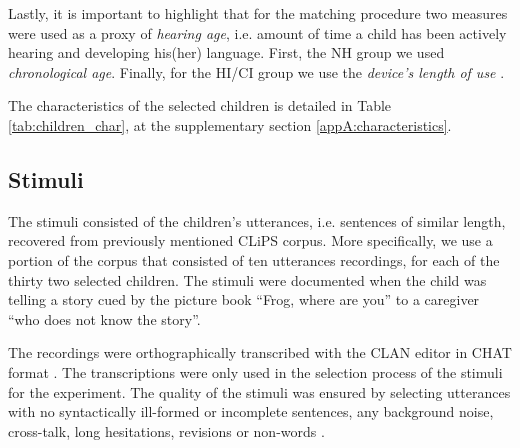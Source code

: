 Lastly, it is important to highlight that for the matching procedure two measures were used as a proxy of \textit{hearing age}, i.e. amount of time a child has been actively hearing and developing his(her) language. First, the NH group we used \textit{chronological age}. Finally, for the HI/CI group  we use the \textit{device's length of use} \citep{Faes_et_al_2021}.
%
\begin{comment}
	for the NH group uses the child's \textit{age} (at recording), the method cannot use the same variable for the other two groups. This is due to the fact that \textit{age} is merely used as a proxy, for the amount of time a child has been developing his(her) language. In that sense, more appropriate variables to use under the HI/CI group would be e.g. the \textit{device length of use}, which approximates the ``hearing age'' of such children, or their \textit{vocabulary size}, which resembles their "lexical age" \citep{Faes_et_al_2021}. For this research, we consider the \textit{device length of use} as the simplest one to implement. 
\end{comment}

The characteristics of the selected children is detailed in Table \ref{tab:children_char}, at the supplementary section \ref{appA:characteristics}. 

%
%
\subsection{Stimuli} \label{ss:stimuli}
%
The stimuli consisted of the children's utterances, i.e. sentences of similar length, recovered from previously mentioned CLiPS corpus. More specifically, we use a portion of the corpus that consisted of ten utterances recordings, for each of the thirty two selected children. The stimuli were documented when the child was telling a story cued by the picture book ``Frog, where are you'' \citep{Mayer_1969} to a caregiver ``who does not know the story''. 

The recordings were orthographically transcribed with the CLAN editor in CHAT format \cite{MacWhinney_2020}. The transcriptions were only used in the selection process of the stimuli for the experiment. The quality of the stimuli was ensured by selecting utterances with no syntactically ill-formed or incomplete sentences, any background noise, cross-talk, long hesitations, revisions or non-words \citep{Boonen_et_al_2021}. 

